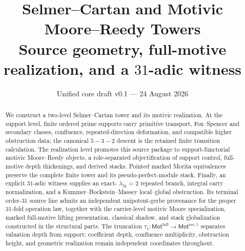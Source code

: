 \documentclass[11pt]{article}
\title{\textbf{Selmer--Cartan and Motivic Moore--Reedy Towers}\\[1.5mm]
\large Source geometry, full-motive realization, and a \(31\)-adic witness}
\author{}
\date{Unified core draft v0.1 --- 24 August 2026}
\theoremstyle{remark}
\providecommand{\RecOneMot}{\mathsf{Mot}^{\mathrm{rec},1}}
\providecommand{\FullMot}{\mathsf{Mot}^{\mathrm{full}}}
\providecommand{\tauone}{\tau_{1}}
\begin{document}
\maketitle

\begin{abstract}
We construct a two-level Selmer--Cartan tower and its motivic realization.  At
the support level, finite ordered prime supports carry primitive transport,
Fox--Spencer and secondary classes, confluence, repeated-direction deformation,
and compatible higher obstruction data; the canonical \(5\!-
\!3\!-\!2\) descent is the retained finite transition calculation.  The
realization level promotes this source package to support-functorial motivic Moore--Reedy
objects, a role-separated objectification of support control, full-motive depth
thickenings, and derived stacks.  Pointed marked Morita equivalences preserve
the complete finite tower and its pseudo-perfect-module stack.
Finally, an explicit \(31\)-adic witness supplies an exact-
\(\lambda_{31}=2\) repeated branch, integral carry normalization, and a
Kummer--Bockstein--Massey local--global obstruction.  Its terminal order-\(31\)
source line admits an independent unipotent-gerbe provenance for the proper
\(31\)-fold operation law, together with the carrier-level motivic Moore
specialization, marked full-motive lifting presentation, classical shadow, and
stack globalization constructed in the structural parts.  The truncation
\(\tauone:\FullMot\to\RecOneMot\) separates valuation depth from support;
coefficient depth, confluence multiplicity, obstruction height, and geometric
realization remain independent coordinates throughout.
\end{abstract}

\tableofcontents
\end{document}
